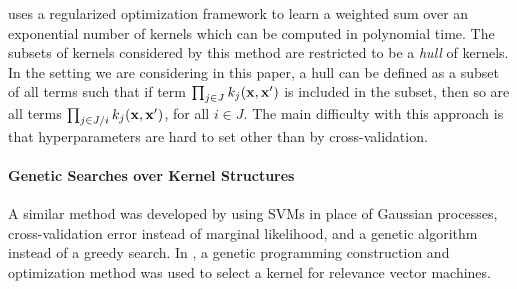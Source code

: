 \documentclass[twoside]{article}
\begin{document}
\cite{DBLP:journals/corr/abs-0909-0844} uses a regularized optimization framework to learn a weighted sum over an exponential number of kernels which can be computed in polynomial time.
The subsets of kernels considered by this method are restricted to be a \textit{hull} of kernels. In the setting we are considering in this paper, a hull can be defined as a subset of all terms such that if term $\prod_{j \in J} k_j(\bf x, x')$ is included in the subset, then so are all terms $\prod_{j \in J / i} k_j(\bf x, x')$, for all $i \in J$.
%
The main difficulty with this approach is that hyperparameters are hard to set other than by cross-validation. 




\paragraph{Genetic Searches over Kernel Structures}
A similar method was developed by \cite{diosan2007evolving} using SVMs in place of Gaussian processes, cross-validation error instead of marginal likelihood, and a genetic algorithm instead of a greedy search.  
In \cite{bing2010gp}, a genetic programming construction and optimization method was used to select a kernel for relevance vector machines.
\end{document}
